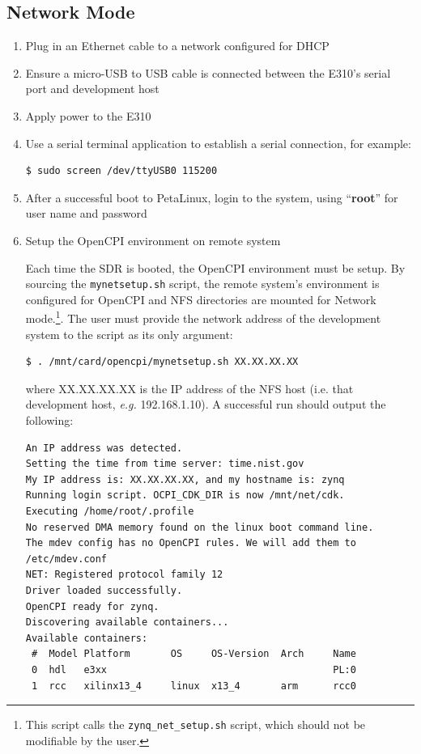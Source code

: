 \subsection{Network Mode}
\begin{enumerate}
\item Plug in an Ethernet cable to a network configured for DHCP
\item Ensure a micro-USB to USB cable is connected between the E310's serial port and development host
\item Apply power to the E310
\item Use a serial terminal application to establish a serial connection, for example:

\begin{verbatim}
$ sudo screen /dev/ttyUSB0 115200
\end{verbatim}

\item After a successful boot to PetaLinux, login to the system, using  ``\textbf{root}'' for user name and password

\item Setup the OpenCPI environment on remote system

\begin{flushleft}
Each time the SDR is booted, the OpenCPI environment must be setup. By sourcing the \texttt{mynetsetup.sh} script, the remote system's environment is configured for OpenCPI and NFS directories are mounted for Network mode.\footnote{This script calls the \texttt{zynq\_net\_setup.sh} script, which should not be modifiable by the user.}. The user must provide the network address of the development system to the script as its only argument:
\begin{verbatim}
$ . /mnt/card/opencpi/mynetsetup.sh XX.XX.XX.XX
\end{verbatim}

where XX.XX.XX.XX is the IP address of the NFS host (i.e. that development host, \textit{e.g.} 192.168.1.10). A successful run should output the following:
\begin{verbatim}
An IP address was detected.
Setting the time from time server: time.nist.gov
My IP address is: XX.XX.XX.XX, and my hostname is: zynq
Running login script. OCPI_CDK_DIR is now /mnt/net/cdk.
Executing /home/root/.profile
No reserved DMA memory found on the linux boot command line.
The mdev config has no OpenCPI rules. We will add them to /etc/mdev.conf
NET: Registered protocol family 12
Driver loaded successfully.
OpenCPI ready for zynq.
Discovering available containers...
Available containers:
 #  Model Platform       OS     OS-Version  Arch     Name
 0  hdl   e3xx                                       PL:0
 1  rcc   xilinx13_4     linux  x13_4       arm      rcc0
\end{verbatim}

\end{flushleft}
\end{enumerate}

